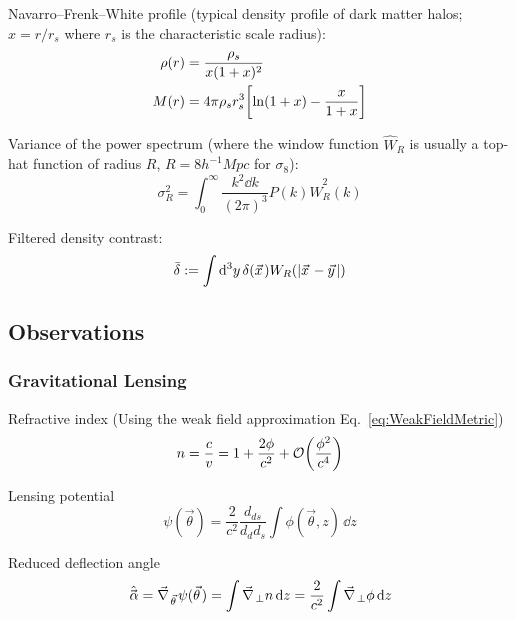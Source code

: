 		\noindent
		Navarro--Frenk--White profile (typical density profile of dark matter halos; $x=r/r_s$ where $r_s$ is the characteristic scale radius):
		\begin{align}
			\rho(r) &= \frac{\rho_s}{x(1+x)^2} \\
			M(r) &= 4\pi \rho_s r_s^3 \qty[\ln(1+x) - \frac{x}{1+x}]
		\end{align}

		\noindent
		Variance of the power spectrum (where the window function $\hat{W}_R$ is usually a top-hat function of radius $R$, \eg $R=8h^{-1}\unit{Mpc}$ for $\sigma_8$):
		\begin{equation}
			\sigma_R^2 = \int_{0}^{\infty} \frac{k^2 \dd k}{(2\pi)^3} P(k) \hat{W}^2_R(k) 
		\end{equation}

		\noindent
		Filtered density contrast:
		\begin{equation}
			\bar{\delta} := \int \dd^3 y \, \delta(\vec{x}) W_R(\abs{\vec{x}-\vec{y}})
		\end{equation}

	\subsection{Observations}
		\subsubsection{Gravitational Lensing}
			Refractive index (Using the weak field approximation Eq.~\ref{eq:WeakFieldMetric})
			\begin{equation}
				n = \frac{c}{v} = 1 + \frac{2 \phi}{c^2} + \mathcal{O}\qty(\frac{\phi^2}{c^4})
			\end{equation}

			\noindent
			Lensing potential
			\begin{equation}
				\psi (\vec{\theta})  = \frac{2}{c^2} \frac{d_{ds}}{d_d d_s} \int \phi(\vec{\theta}, z) \, \dd z
			\end{equation}

			\noindent
			Reduced deflection angle
			\begin{equation}
				\hat{\vec{\alpha}}
				= \Nabla_{\vec{\theta}} \psi(\vec{\theta})
				= \int \Nabla_\perp n \, \dd z
				= \frac{2}{c^2} \int \Nabla_\perp \phi \, \dd z
			\end{equation}

